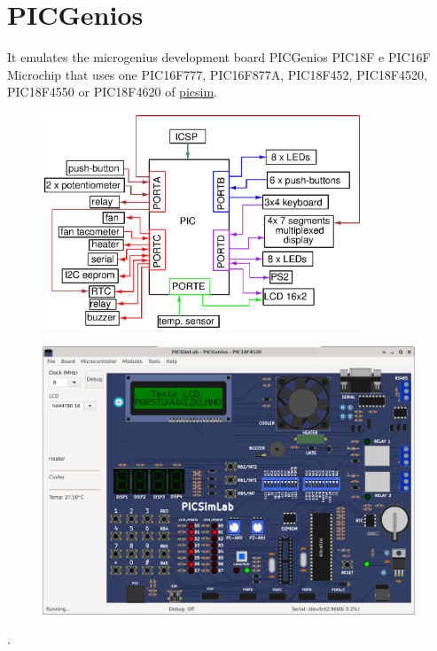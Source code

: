 \section{PICGenios}

It emulates the microgenius development board PICGenios PIC18F e PIC16F Microchip that uses one PIC16F777, PIC16F877A, PIC18F452, PIC18F4520, PIC18F4550 or PIC18F4620 of \href{https://github.com/lcgamboa/picsim}{picsim}.

\begin{figure}[H]
\center
\includegraphics[width=0.85\textwidth]{img/blocks_p4.eps} 
\end{figure} 


\begin{figure}[H]
\center
\includegraphics[width=0.99\textwidth]{img/picsimlab4.png} 
\end{figure} 

.\vspace{0.5cm}

